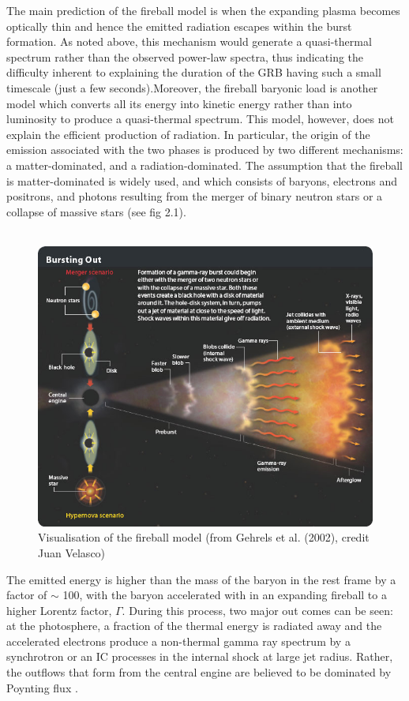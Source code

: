  The main prediction of the fireball model is when the expanding plasma becomes optically thin and hence the emitted radiation escapes within the burst formation.
As noted above, this mechanism would generate a quasi-thermal spectrum rather than the observed power-law spectra, thus indicating the difficulty inherent to explaining the duration of the GRB having such a small timescale (just a few seconds).Moreover, the fireball baryonic load is another model which converts all its energy into kinetic energy rather than into luminosity to produce a quasi-thermal spectrum. This model, however, does not explain the efficient production of radiation. In particular, the origin of the emission associated with the two phases is produced by two different mechanisms: a matter-dominated, and a radiation-dominated. The  assumption  that  the  fireball is  matter-dominated  is  widely  used, and which consists of baryons, electrons and positrons, and  photons  resulting from  the merger of binary  neutron stars or a collapse of massive stars \citep{10} \citep{15} (see fig 2.1). \\\\ 
\begin{figure}[h]
\begin{center}
\includegraphics[scale=0.5]{Figures/fig5.png}
\caption{Visualisation of the fireball model (from Gehrels et al. (2002), credit
Juan Velasco)\citep{13}}
\end{center}
\end{figure} 
The  emitted  energy  is  higher than  the  mass of  the baryon in the rest frame by a factor of  $\sim $ 100, with  the  baryon  accelerated  with in an expanding fireball to a higher Lorentz factor, $\Gamma $. During this process, two major out comes can be seen: at the photosphere, a fraction of the thermal energy is radiated away  and  the  accelerated  electrons  produce  a non-thermal  gamma ray spectrum by a synchrotron  or an IC  processes in the  internal shock at large jet radius. Rather, the outflows that form from the central engine are believed to be dominated by Poynting flux \citep{15}\citep{16}.\\\\
